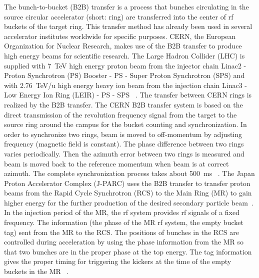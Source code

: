 The bunch-to-bucket (B2B) transfer is a process that bunches circulating in the source circular accelerator (short: ring) are transferred into the center of rf buckets of the target ring. This transfer method has already been used in several accelerator institutes worldwide for specific purposes. CERN, the European Organization for Nuclear Research, makes use of the B2B transfer to produce high energy beams for scientific research. The Large Hadron Collider (LHC) is supplied with \SI{7}{TeV} high energy proton beam from the injector chain Linac2 - Proton Synchrotron (PS) Booster - PS -  Super Proton Synchrotron (SPS) and with \SI{2.76}{TeV/u} high energy heavy ion beam from the injection chain Linac3 - Low Energy Ion Ring (LEIR) - PS - SPS  ~\cite{noauthor_cern_nodate}. The transfer between CERN rings is realized by the B2B transfer. The CERN B2B transfer system is based on the direct transmission of the revolution frequency signal from the target to the source ring around the campus for the bucket counting and synchronization. In order to synchronize two rings, beam is moved to off-momentum by adjusting frequency (magnetic field is constant). The phase difference between two rings varies periodically. Then the azimuth error between two rings is measured and beam is moved back to the reference momentum when beam is at correct azimuth. The complete synchronization process takes about \SI{500}{\ms} ~\cite{damerau_lecture_2017}. The Japan Proton Accelerator Complex (J-PARC) uses the B2B transfer to transfer proton beams from the Rapid Cycle Synchrotron (RCS) to the Main Ring (MR) to gain higher energy for the further production of the desired secondary particle beam~\cite{noauthor_j-parc_2016}. In the injection period of the MR, the rf system provides rf signals of a fixed frequency. The information (the phase of the MR rf system, the empty bucket tag) sent from the MR to the RCS. The positions of bunches in the RCS are controlled during acceleration by using the phase information from the MR so that two bunches are in the proper phase at the top energy. The tag information gives the proper timing for triggering the kickers at the time of the empty buckets in the MR ~\cite{tamura_synchronization_2006}. 

